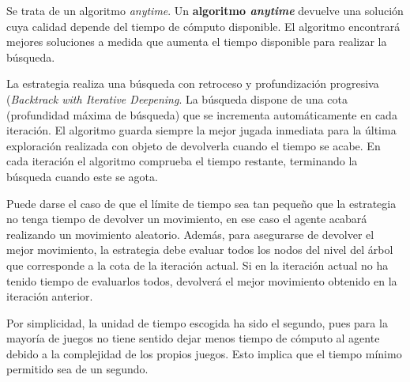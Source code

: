 Se trata de un algoritmo \textit{anytime}.
Un \textbf{algoritmo \textit{anytime}} devuelve una solución cuya calidad depende del tiempo de cómputo disponible.
El algoritmo encontrará mejores soluciones a medida que aumenta el tiempo disponible para realizar la búsqueda.

La estrategia realiza una búsqueda con retroceso y profundización progresiva (\textit{Backtrack with Iterative Deepening}.
La búsqueda dispone de una cota (profundidad máxima de búsqueda) que se incrementa automáticamente en cada iteración.
El algoritmo guarda siempre la mejor jugada inmediata para la última exploración realizada con objeto de devolverla cuando el tiempo se acabe.
En cada iteración el algoritmo comprueba el tiempo restante, terminando la búsqueda cuando este se agota.

Puede darse el caso de que el límite de tiempo sea tan pequeño que la estrategia no tenga tiempo de devolver un movimiento, en ese caso el agente acabará realizando un movimiento aleatorio.
Además, para asegurarse de devolver el mejor movimiento, la estrategia debe evaluar todos los nodos del nivel del árbol que corresponde a la cota de la iteración actual.
Si en la iteración actual no ha tenido tiempo de evaluarlos todos, devolverá el mejor movimiento obtenido en la iteración anterior.

Por simplicidad, la unidad de tiempo escogida ha sido el segundo, pues para la mayoría de juegos no tiene sentido dejar menos tiempo de cómputo al agente debido a la complejidad de los propios juegos.
Esto implica que el tiempo mínimo permitido sea de un segundo.
